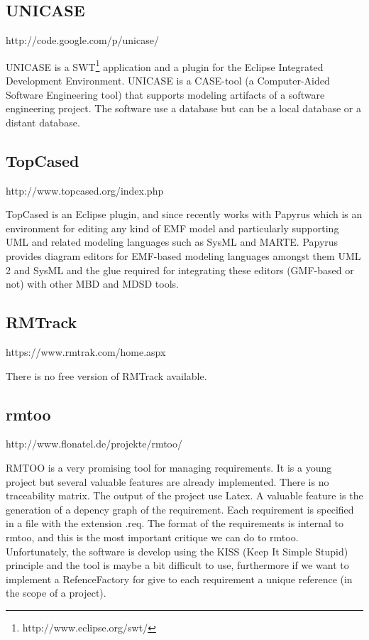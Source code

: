 \documentclass{llncs}
\begin{document}
\subsection{UNICASE}

http://code.google.com/p/unicase/

UNICASE is a SWT\footnote{http://www.eclipse.org/swt/} application and a plugin for the Eclipse Integrated Development Environment. UNICASE is a CASE-tool (a Computer-Aided Software Engineering tool) that supports modeling artifacts of a software engineering project. The software use a database but can be a local database or a distant database. 

\subsection{TopCased}

http://www.topcased.org/index.php

TopCased is an Eclipse plugin, and since recently works with Papyrus which is an environment for editing any kind of EMF model and particularly supporting UML and related modeling languages such as SysML and MARTE. Papyrus provides diagram editors for EMF-based modeling languages amongst them UML 2 and SysML and the glue required for integrating these editors (GMF-based or not) with other MBD and MDSD tools.

\subsection{RMTrack}

https://www.rmtrak.com/home.aspx

There is no free version of RMTrack available.

\subsection{rmtoo}

http://www.flonatel.de/projekte/rmtoo/

RMTOO is a very promising tool for managing requirements. It is a young project but several valuable features are already implemented.
There is no traceability matrix. The output of the project use Latex.
A valuable feature is the generation of a depency graph of the requirement.
Each requirement is specified in a file with the extension .req. The format of the requirements is internal to rmtoo, and this is the most important critique we can do to rmtoo.
Unfortunately, the software is develop using the KISS (Keep It Simple Stupid) principle and the tool is maybe a bit difficult to use, furthermore if we want to implement a RefenceFactory for give to each requirement a unique reference (in the scope of a project).
\end{document}
